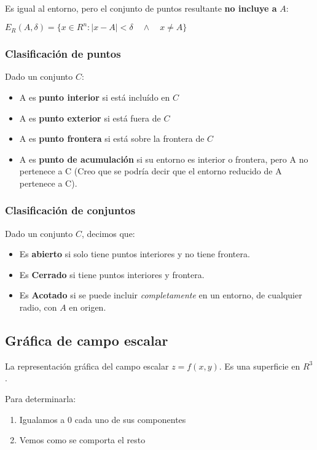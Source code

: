Es igual al entorno,
pero el conjunto de puntos resultante \textbf{no incluye a} \(A\):

\(E_R(A,\delta) = \{x \in R^{n}: |x-A| < \delta \quad \land \quad x \neq A\}\)


\subsubsection{Clasificación de puntos}

Dado un conjunto \(C\):

\begin{itemize}
    \item A es \textbf{punto interior} si está incluído en \(C\)
    \item A es \textbf{punto exterior} si está fuera de \(C\)
    \item A es \textbf{punto frontera} si está sobre la frontera de \(C\)
    \item A es \textbf{punto de acumulación} si su entorno es interior o
          frontera, pero A no pertenece a C (Creo que se podría decir que el entorno
          reducido de A pertenece a C).
\end{itemize}

\subsubsection{Clasificación de conjuntos}

Dado un conjunto \(C\), decimos que:

\begin{itemize}
    \item Es \textbf{abierto} si solo tiene puntos interiores y no tiene
          frontera.
    \item Es \textbf{Cerrado} si tiene puntos interiores y frontera.
    \item Es \textbf{Acotado} si se puede incluir \textit{completamente} en un
          entorno, de cualquier radio, con \(A\) en origen.
\end{itemize}

\subsection{Gráfica de campo escalar}

La representación gráfica del campo escalar \(z = f(x,y)\).
Es una superficie en \(R^{3}\).

Para determinarla:

\begin{enumerate}
    \item Igualamos a 0 cada uno de sus componentes
    \item Vemos como se comporta el resto
\end{enumerate}

